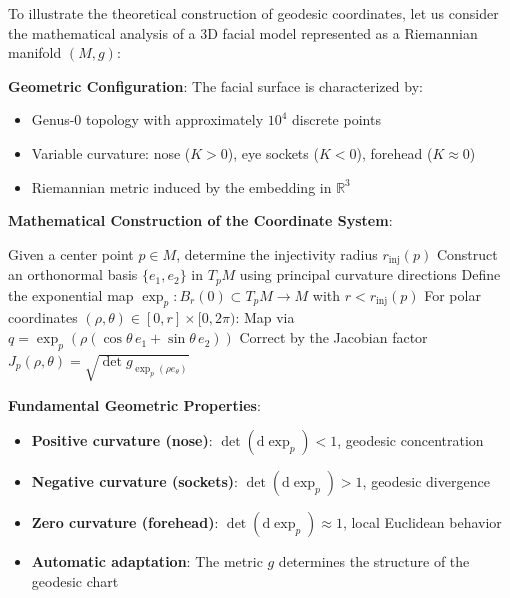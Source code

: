 \begin{example}
To illustrate the theoretical construction of geodesic coordinates, let us consider the mathematical analysis of a 3D facial model represented as a Riemannian manifold $(M, g)$:

\textbf{Geometric Configuration}:
The facial surface is characterized by:
\begin{itemize}
    \item Genus-0 topology with approximately $10^4$ discrete points
    \item Variable curvature: nose ($K > 0$), eye sockets ($K < 0$), forehead ($K \approx 0$)
    \item Riemannian metric induced by the embedding in $\mathbb{R}^3$
\end{itemize}

\textbf{Mathematical Construction of the Coordinate System}:

\begin{algorithm}[H]
\caption{Rigorous Construction of Geodesic Charts}
\begin{algorithmic}[1]
    \State Given a center point $p \in M$, determine the injectivity radius $r_{\text{inj}}(p)$
    \State Construct an orthonormal basis $\{e_1, e_2\}$ in $T_p M$ using principal curvature directions
    \State Define the exponential map $\exp_p: B_r(0) \subset T_p M \to M$ with $r < r_{\text{inj}}(p)$
    \State For polar coordinates $(\rho, \theta) \in [0,r] \times [0,2\pi)$:
    \State \quad Map via $q = \exp_p(\rho(\cos\theta \, e_1 + \sin\theta \, e_2))$
    \State Correct by the Jacobian factor $J_p(\rho,\theta) = \sqrt{\det g_{\exp_p(\rho e_\theta)}}$
\end{algorithmic}
\end{algorithm}

\textbf{Fundamental Geometric Properties}:
\begin{itemize}
    \item \textbf{Positive curvature (nose)}: $\det(\text{d}\exp_p) < 1$, geodesic concentration
    \item \textbf{Negative curvature (sockets)}: $\det(\text{d}\exp_p) > 1$, geodesic divergence
    \item \textbf{Zero curvature (forehead)}: $\det(\text{d}\exp_p) \approx 1$, local Euclidean behavior
    \item \textbf{Automatic adaptation}: The metric $g$ determines the structure of the geodesic chart
\end{itemize}
\end{example}

